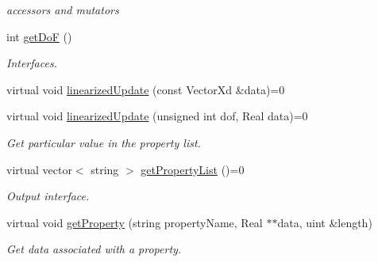 \begin{DoxyCompactItemize}
\begin{DoxyCompactList}\small\item\em accessors and mutators \item\end{DoxyCompactList}\item 
\hypertarget{classvoom_1_1_base_node_ae1f243cde7db41d75d7970ca94603b19}{
int \hyperlink{classvoom_1_1_base_node_ae1f243cde7db41d75d7970ca94603b19}{getDoF} ()}
\label{classvoom_1_1_base_node_ae1f243cde7db41d75d7970ca94603b19}

\begin{DoxyCompactList}\small\item\em Interfaces. \item\end{DoxyCompactList}\item 
virtual void \hyperlink{classvoom_1_1_base_node_a27a440cc623e936472f5052f2731d32f}{linearizedUpdate} (const VectorXd \&data)=0
\item 
\hypertarget{classvoom_1_1_base_node_ad905ba6a93f5918aada0e60050eb0cae}{
virtual void \hyperlink{classvoom_1_1_base_node_ad905ba6a93f5918aada0e60050eb0cae}{linearizedUpdate} (unsigned int dof, Real data)=0}
\label{classvoom_1_1_base_node_ad905ba6a93f5918aada0e60050eb0cae}

\begin{DoxyCompactList}\small\item\em Get particular value in the property list. \item\end{DoxyCompactList}\item 
\hypertarget{classvoom_1_1_base_node_aa2420d5244bb7e3024c07f07f0c4b298}{
virtual vector$<$ string $>$ \hyperlink{classvoom_1_1_base_node_aa2420d5244bb7e3024c07f07f0c4b298}{getPropertyList} ()=0}
\label{classvoom_1_1_base_node_aa2420d5244bb7e3024c07f07f0c4b298}

\begin{DoxyCompactList}\small\item\em Output interface. \item\end{DoxyCompactList}\item 
\hypertarget{classvoom_1_1_base_node_a4d42efec19c4e3f4770828688daa65c5}{
virtual void \hyperlink{classvoom_1_1_base_node_a4d42efec19c4e3f4770828688daa65c5}{getProperty} (string propertyName, Real $\ast$$\ast$data, uint \&length)}
\label{classvoom_1_1_base_node_a4d42efec19c4e3f4770828688daa65c5}

\begin{DoxyCompactList}\small\item\em Get data associated with a property. \item\end{DoxyCompactList}\end{DoxyCompactItemize}
